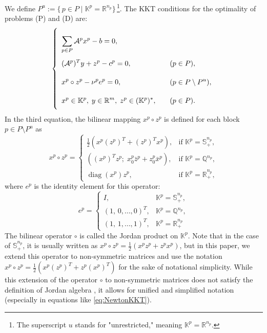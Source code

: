 We define $P^u := \{\, p \in P \mid \mathbb{K}^p = \mathbb{R}^{n_p} \}\,$\footnote{%
  The superscript $u$ stands for "unrestricted," meaning $\mathbb{K}^p = \mathbb{R}^{n_p}$.
}.
The KKT conditions for the optimality of problems (P) and (D) are:
\begin{equation}
    \everymath{\displaystyle}
    \renewcommand{\arraystretch}{2.5}
    \left\{
    \begin{array}{ll}
        \sum_{p \in P} \mathcal{A}^p x^p - b = 0, & \\[-4pt]
        (\mathcal{A}^p)^T y + z^p - c^p = 0, & \quad (p \in P),\\[-4pt]
        x^p \circ z^p - \nu^p e^p = 0, & \quad (p \in P \setminus P^u),\\[-4pt]
        x^p \in \mathbb{K}^p,\; y \in \mathbb{R}^m,\; z^p \in (\mathbb{K}^p)^*, & \quad (p \in P).
    \end{array}
    \right.
    \label{eq:KKTcond}
\end{equation}
In the third equation, the bilinear mapping $x^p \circ z^p$ is defined for each block $p \in P \setminus P^u$ as
\[
  x^p \circ z^p = 
  \begin{cases}
    \frac{1}{2} \left( x^p (z^p)^T + (z^p)^T x^p \right), 
      & \text{if } \mathbb{K}^p = \mathbb{S}^{n_p}_+,\\[4pt]
    \left( (x^p)^T z^p;\; x^p_0 \bar{z}^p + z^p_0 \bar{x}^p \right),
      & \text{if } \mathbb{K}^p = \mathbb{Q}^{n_p},\\[4pt]
    \operatorname{diag}(x^p) z^p,
      & \text{if } \mathbb{K}^p = \mathbb{R}^{n_p}_+,
  \end{cases}
\]
where $e^p$ is the identity element for this operator:
\[
  e^p = 
  \begin{cases}
    I, & \mathbb{K}^p = \mathbb{S}^{n_p}_+,\\[3pt]
    (1,\,0,\ldots,0)^T, & \mathbb{K}^p = \mathbb{Q}^{n_p},\\[3pt]
    (1,\,1,\ldots,1)^T, & \mathbb{K}^p = \mathbb{R}^{n_p}_+ %
  \end{cases}
\]
The bilinear operator $\circ$ is called the Jordan product on $\mathbb{K}^p$.
Note that in the case of $\mathbb{S}^{n_p}_+$, it is usually written as $x^p \circ z^p = \frac{1}{2}(x^p z^p + z^p x^p)$, but in this paper, we extend this operator to non-symmetric matrices and use the notation $x^p \circ z^p = \frac{1}{2} \left( x^p (z^p)^T + z^p (x^p)^T \right)$ for the sake of notational simplicity.
While this extension of the operator $\circ$ to non-symmetric matrices does not satisfy the definition of Jordan algebra \cite{Faraut1994}, it allows for unified and simplified notation (especially in equations like \eqref{eq:NewtonKKT}).



